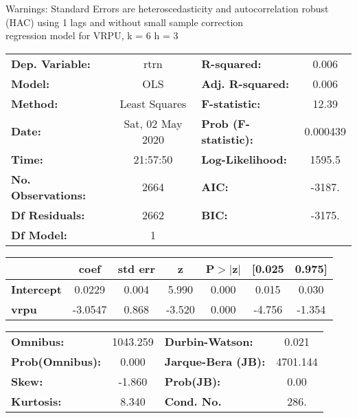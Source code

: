 Warnings: \newline
 [1] Standard Errors are heteroscedasticity and autocorrelation robust (HAC) using 1 lags and without small sample correction\\ 

regression model for VRPU, k = 6 h = 3\begin{center}
\begin{tabular}{lclc}
\toprule
\textbf{Dep. Variable:}    &       rtrn       & \textbf{  R-squared:         } &     0.006   \\
\textbf{Model:}            &       OLS        & \textbf{  Adj. R-squared:    } &     0.006   \\
\textbf{Method:}           &  Least Squares   & \textbf{  F-statistic:       } &     12.39   \\
\textbf{Date:}             & Sat, 02 May 2020 & \textbf{  Prob (F-statistic):} &  0.000439   \\
\textbf{Time:}             &     21:57:50     & \textbf{  Log-Likelihood:    } &    1595.5   \\
\textbf{No. Observations:} &        2664      & \textbf{  AIC:               } &    -3187.   \\
\textbf{Df Residuals:}     &        2662      & \textbf{  BIC:               } &    -3175.   \\
\textbf{Df Model:}         &           1      & \textbf{                     } &             \\
\bottomrule
\end{tabular}
\begin{tabular}{lcccccc}
                   & \textbf{coef} & \textbf{std err} & \textbf{z} & \textbf{P$> |$z$|$} & \textbf{[0.025} & \textbf{0.975]}  \\
\midrule
\textbf{Intercept} &       0.0229  &        0.004     &     5.990  &         0.000        &        0.015    &        0.030     \\
\textbf{vrpu}      &      -3.0547  &        0.868     &    -3.520  &         0.000        &       -4.756    &       -1.354     \\
\bottomrule
\end{tabular}
\begin{tabular}{lclc}
\textbf{Omnibus:}       & 1043.259 & \textbf{  Durbin-Watson:     } &    0.021  \\
\textbf{Prob(Omnibus):} &   0.000  & \textbf{  Jarque-Bera (JB):  } & 4701.144  \\
\textbf{Skew:}          &  -1.860  & \textbf{  Prob(JB):          } &     0.00  \\
\textbf{Kurtosis:}      &   8.340  & \textbf{  Cond. No.          } &     286.  \\
\bottomrule
\end{tabular}
\end{center}


